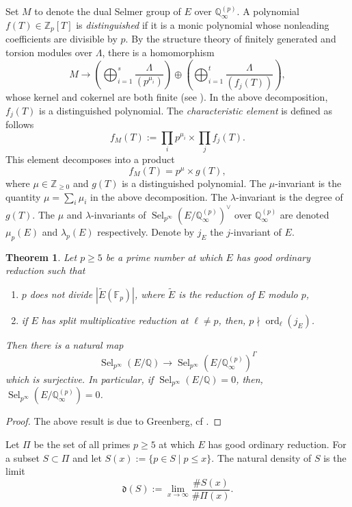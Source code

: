 \documentclass[11pt]{amsart}
\newtheorem{theorem}{Theorem}[section]
\newcommand{\Z}{\mathbb{Z}}
\newcommand{\Q}{\mathbb{Q}}
\newcommand{\F}{\mathbb{F}}
\newcommand{\op}[1]{\operatorname{#1}}
\numberwithin{equation}{section}
\begin{document}
\par Set $M$ to denote the dual Selmer group of $E$ over $\Q_\infty^{(p)}$. A polynomial $f(T)\in \Z_p[T]$ is \emph{distinguished} if it is a monic polynomial whose nonleading coefficients are divisible by $p$. By the structure theory of finitely generated and torsion modules over $\Lambda$, there is a homomorphism 
\[M\longrightarrow \left(\bigoplus_{i=1}^s \frac{\Lambda}{(p^{\mu_i})}\right)\oplus \left( \bigoplus_{i=1}^t \frac{\Lambda}{(f_j(T))} \right),\] whose kernel and cokernel are both finite (see \cite[Chapter 13]{washington1997introduction}). In the above decomposition, $f_j(T)$ is a distinguished polynomial. The \emph{characteristic element} is defined as follows
\[f_M(T):=\prod_i p^{\mu_i} \times \prod_j f_j(T).\] This element decomposes into a product 
\[f_M(T)=p^\mu\times g(T),\] where $\mu\in \Z_{\geq 0}$ and $g(T)$ is a distinguished polynomial. The $\mu$-invariant is the quantity $\mu=\sum_i \mu_i$ in the above decomposition. The $\lambda$-invariant is the degree of $g(T)$. The $\mu$ and $\lambda$-invariants of $\op{Sel}_{p^\infty}(E/\Q_\infty^{(p)})^\vee$ over $\Q_\infty^{(p)}$ are denoted $\mu_p(E)$ and $\lambda_p(E)$ respectively. Denote by $j_E$ the $j$-invariant of $E$.  
\begin{theorem}\label{thm 2.2}
    Let $p\geq 5$ be a prime number at which $E$ has good ordinary reduction such that 
    \begin{enumerate}
        \item $p$ does not divide $|\widetilde{E}(\F_p)|$, where $\widetilde{E}$ is the reduction of $E$ modulo $p$, 
        \item if $E$ has split multiplicative reduction at $\ell\neq p$, then, $p\nmid \op{ord}_\ell(j_E)$.
    \end{enumerate}
    Then there is a natural map
    \[\op{Sel}_{p^\infty}(E/\Q)\rightarrow \op{Sel}_{p^\infty} (E/\Q_\infty^{(p)})^\Gamma \] which is surjective. In particular, if $\op{Sel}_{p^\infty}(E/\Q)=0$, then, $\op{Sel}_{p^\infty}(E/\Q_\infty^{(p)})=0$.
\end{theorem}
\begin{proof}
    The above result is due to Greenberg, cf \cite[Proposition 3.8]{greenbergIwasawa97}.
\end{proof}


\par Let $\Pi$ be the set of all primes $p\geq 5$ at which $E$ has good ordinary reduction. For a subset $S\subset \Pi$ and let $S(x):=\{p\in S\mid p\leq x\}$. The natural density of $S$ is the limit 
\[\mathfrak{d}(S):=\lim_{x\rightarrow \infty} \frac{\# S(x)}{\# \Pi(x)}.\]
\end{document}
